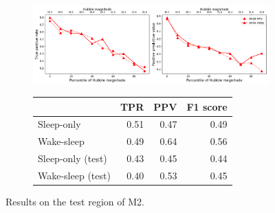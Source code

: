 \begin{figure}[ht]
\begin{subfigure}{\textwidth}
\centering
\includegraphics[width = \textwidth]{figures/summary_statistics_m2_alt.png}
\end{subfigure}
\begin{subfigure}{\textwidth}
\begin{center}
\begin{tabular}{lrrr}
\toprule
 &   TPR &   PPV &  F1 score  \\
\midrule
 Sleep-only &  0.51 &  0.47 &      0.49 \\
 Wake-sleep &  0.49 &  0.64 &      0.56  \\
Sleep-only (test) &  0.43 &  0.45 & 0.44 \\
 Wake-sleep (test) &  0.40 &  0.53 &      0.45  \\
\bottomrule
\end{tabular}
\par\vspace{0pt}
\end{center}
\end{subfigure}\hfill
\caption{Results on the test region of M2. }
\end{figure}

